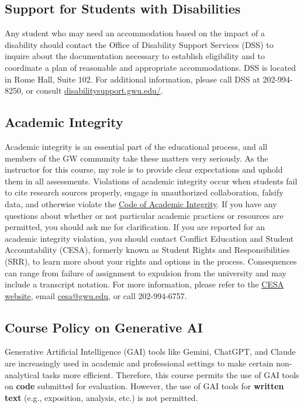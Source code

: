 \documentclass[12pt,letterpaper]{article}
\begin{document}
\subsection*{Support for Students with Disabilities}

Any student who may need an accommodation based on the impact of a
disability should contact the Office of Disability Support Services
(DSS) to inquire about the documentation necessary to establish
eligibility and to coordinate a plan of reasonable and appropriate
accommodations. DSS is located in Rome Hall, Suite 102. For
additional information, please call DSS at 202-994-8250, or consult
\href{https://disabilitysupport.gwu.edu/}{disabilitysupport.gwu.edu/}.

\subsection*{Academic Integrity}

Academic integrity is an essential part of the educational process,
and all members of the GW community take these matters very
seriously. As the instructor for this course, my role is to provide
clear expectations and uphold them in all assessments. Violations of
academic integrity occur when students fail to cite research sources
properly, engage in unauthorized collaboration, falsify data, and
otherwise violate the
\href{https://students.gwu.edu/code-academic-integrity}{Code of
Academic Integrity}. If you have any questions about whether or not
particular academic practices or resources are permitted, you should
ask me for clarification. If you are reported for an academic
integrity violation, you should contact Conflict Education and
Student Accountability (CESA), formerly known as Student Rights and
Responsibilities (SRR), to learn more about your rights and options
in the process. Consequences can range from failure of assignment to
expulsion from the university and may include a transcript notation.
For more information, please refer to the
\href{https://students.gwu.edu/cesa}{CESA website}, email
\href{mailto:cesa@gwu.edu}{cesa@gwu.edu}, or call 202-994-6757.

\subsection*{Course Policy on Generative AI}

Generative Artificial Intelligence (GAI) tools like Gemini, ChatGPT,
and Claude are increasingly used in academic and professional
settings to make certain non-analytical tasks more efficient.
Therefore, this course permits the use of GAI tools on \textbf{code}
submitted for evaluation. However, the use of GAI tools for
\textbf{written text} (e.g., exposition, analysis, etc.) is not permitted.
\end{document}
